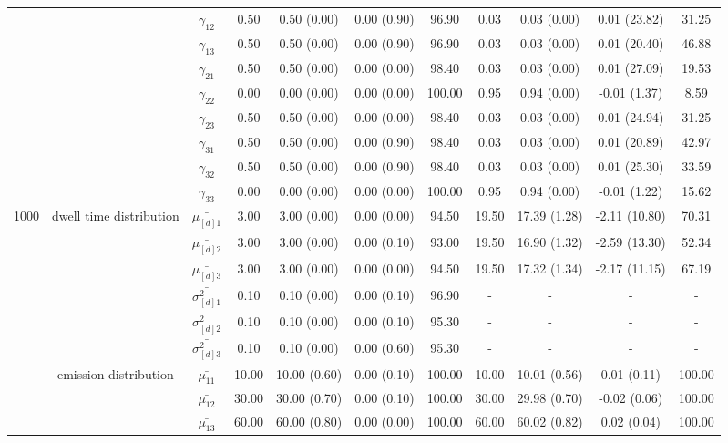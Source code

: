 \begin{table}[h]
{\begin{tabular}{ccccccccccc}
 & \multirow{8}{*}{} & $\gamma_{12}$ & 0.50 & 0.50 (0.00) & 0.00 (0.90) & 96.90 & 0.03 & 0.03 (0.00) & 0.01 (23.82) & 31.25 \\
 &  & $\gamma_{13}$ & 0.50 & 0.50 (0.00) & 0.00 (0.90) & 96.90 & 0.03 & 0.03 (0.00) & 0.01 (20.40) & 46.88 \\
 &  & $\gamma_{21}$ & 0.50 & 0.50 (0.00) & 0.00 (0.00) & 98.40 & 0.03 & 0.03 (0.00) & 0.01 (27.09) & 19.53 \\
 &  & $\gamma_{22}$ & 0.00 & 0.00 (0.00) & 0.00 (0.00) & 100.00 & 0.95 & 0.94 (0.00) & -0.01 (1.37) & 8.59 \\
 &  & $\gamma_{23}$ & 0.50 & 0.50 (0.00) & 0.00 (0.00) & 98.40 & 0.03 & 0.03 (0.00) & 0.01 (24.94) & 31.25 \\
 &  & $\gamma_{31}$ & 0.50 & 0.50 (0.00) & 0.00 (0.90) & 98.40 & 0.03 & 0.03 (0.00) & 0.01 (20.89) & 42.97 \\
 &  & $\gamma_{32}$ & 0.50 & 0.50 (0.00) & 0.00 (0.90) & 98.40 & 0.03 & 0.03 (0.00) & 0.01 (25.30) & 33.59 \\
 &  & $\gamma_{33}$ & 0.00 & 0.00 (0.00) & 0.00 (0.00) & 100.00 & 0.95 & 0.94 (0.00) & -0.01 (1.22) & 15.62 \\ \midrule
1000 & dwell time distribution & $\bar{\mu_{[d]1}}$ & 3.00 & 3.00 (0.00) & 0.00 (0.00) & 94.50 & 19.50 & 17.39 (1.28) & -2.11 (10.80) & 70.31 \\
\multirow{26}{*}{} & \multirow{5}{*}{} & $\bar{\mu_{[d]2}}$ & 3.00 & 3.00 (0.00) & 0.00 (0.10) & 93.00 & 19.50 & 16.90 (1.32) & -2.59 (13.30) & 52.34 \\
 &  & $\bar{\mu_{[d]3}}$ & 3.00 & 3.00 (0.00) & 0.00 (0.00) & 94.50 & 19.50 & 17.32 (1.34) & -2.17 (11.15) & 67.19 \\
 &  & $\bar{\sigma^2_{[d]1}}$ & 0.10 & 0.10 (0.00) & 0.00 (0.10) & 96.90 & - & - & - & - \\
 &  & $\bar{\sigma^2_{[d]2}}$ & 0.10 & 0.10 (0.00) & 0.00 (0.10) & 95.30 & - & - & - & - \\
 &  & $\bar{\sigma^2_{[d]3}}$ & 0.10 & 0.10 (0.00) & 0.00 (0.60) & 95.30 & - & - & - & - \\
 & emission distribution & $\bar{\mu_{11}}$ & 10.00 & 10.00 (0.60) & 0.00 (0.10) & 100.00 & 10.00 & 10.01 (0.56) & 0.01 (0.11) & 100.00 \\
 & \multirow{11}{*}{} & $\bar{\mu_{12}}$ & 30.00 & 30.00 (0.70) & 0.00 (0.10) & 100.00 & 30.00 & 29.98 (0.70) & -0.02 (0.06) & 100.00 \\
 &  & $\bar{\mu_{13}}$ & 60.00 & 60.00 (0.80) & 0.00 (0.00) & 100.00 & 60.00 & 60.02 (0.82) & 0.02 (0.04) & 100.00 \\

\end{tabular}}
\end{table}
